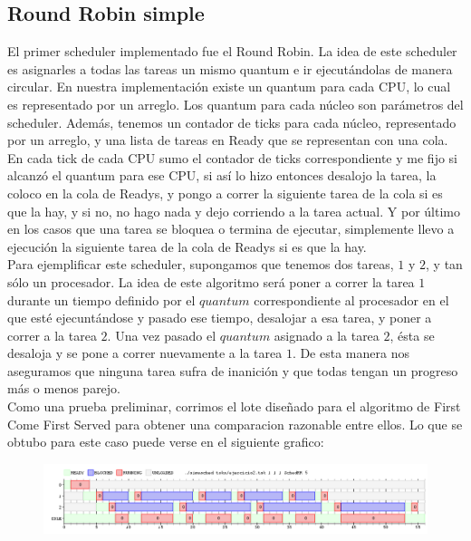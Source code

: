 \subsection{Round Robin simple}
El primer scheduler implementado fue el Round Robin. La idea de este scheduler es asignarles a todas las tareas un mismo quantum e ir ejecutándolas de manera circular. En nuestra implementación existe un quantum para cada CPU, lo cual es representado por un arreglo. Los quantum para cada núcleo son parámetros del scheduler. Además, tenemos un contador de ticks para cada núcleo, representado por un arreglo, y una lista de tareas en Ready que se representan con una cola. En cada tick de cada CPU sumo el contador de ticks correspondiente y me fijo si alcanzó el quantum para ese CPU, si así lo hizo entonces desalojo la tarea, la coloco en la cola de Readys, y pongo a correr la siguiente tarea de la cola si es que la hay, y si no, no hago nada y dejo corriendo a la tarea actual. Y por último en los casos que una tarea se bloquea o termina de ejecutar, simplemente llevo a ejecución la siguiente tarea de la cola de Readys si es que la hay.
\\
Para ejemplificar este scheduler, supongamos que tenemos dos tareas, $1$ y $2$, y tan sólo un procesador. La idea de este algoritmo será poner a correr la tarea $1$ durante un tiempo definido por el $quantum$ correspondiente al procesador en el que esté ejecuntándose y pasado ese tiempo, desalojar a esa tarea, y poner a correr a la tarea $2$. Una vez pasado el $quantum$ asignado a la tarea $2$, ésta se desaloja y se pone a correr nuevamente a la tarea $1$. De esta manera nos aseguramos que ninguna tarea sufra de inanición y que todas tengan un progreso más o menos parejo.
\\
Como una prueba preliminar, corrimos el lote diseñado para el algoritmo de First Come First Served para obtener una comparacion razonable entre ellos. Lo que se obtubo para este caso puede verse en el siguiente grafico:
\\
\begin{figure}[H]
  \centering
	\includegraphics[scale=0.45]{graficos/parte2/rr/1.png}
  \caption[Caption for LOF]{}
\end{figure}
